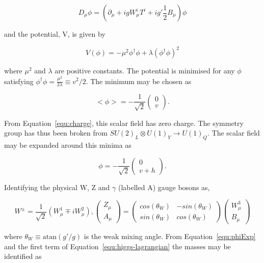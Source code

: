 \begin{equation}
D_{\mu} \phi = (\partial_\mu + igW^i_{\mu}T^i + ig'\frac{1}{2}B_\mu)\phi 
\end{equation}

and the potential, V, is given by

\begin{equation}
V(\phi) =  - \mu^2\phi^{\dagger}\phi + \lambda \left(\phi^{\dagger}\phi\right)^2
\end{equation}

where $\mu^2$ and $\lambda$ are positive constants. The potential is minimised for any $\phi$ satisfying
$\phi^{\dagger}\phi = \frac{\mu^2}{2\lambda} \equiv v^2/2$. The minimum may be chosen as

\begin{equation}
<\phi> =  - \frac{1}{\sqrt{2}}\begin{pmatrix} 0 \\ v\end{pmatrix}.
\end{equation}

From Equation~\ref{equ:charge}, this scalar field has zero charge. The symmetry group has thus been broken from
$SU(2)_L\otimes U(1)_Y \rightarrow U(1)_Q$. The scalar field may be expanded around this minima as

\begin{equation}
\label{equ:phiExp}
\phi =  - \frac{1}{\sqrt{2}}\begin{pmatrix} 0 \\ v + h\end{pmatrix}.
\end{equation}

Identifying the physical W, Z and $\gamma$ (labelled A) gauge bosons as,

\begin{equation}
W^{\pm} = \frac{1}{\sqrt{2}} (W^1_\mu \mp i W^2_\mu), \begin{pmatrix} Z_\mu \\ A_\mu\end{pmatrix} = \begin{pmatrix} cos(\theta_W) & -sin(\theta_W) \\ sin(\theta_W) & cos(\theta_W)\end{pmatrix} \begin{pmatrix} W^3_\mu \\ B_\mu\end{pmatrix}
\end{equation}

where $\theta_W \equiv \text{atan}(g'/g)$ is the weak mixing angle. From Equation~\ref{equ:phiExp} and
the first term of Equation~\ref{equ:higgs-lagrangian} the masses may be identified as

